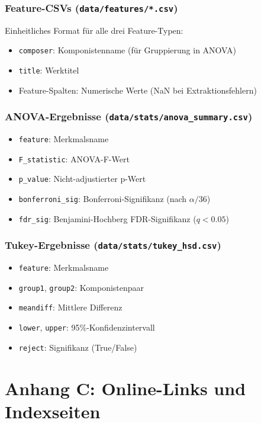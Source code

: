 \documentclass[12pt,a4paper]{article}
\theoremstyle{definition}
\begin{document}
\subsubsection{Feature-CSVs (\texttt{data/features/*.csv})}
Einheitliches Format für alle drei Feature-Typen:
\begin{itemize}
    \item \texttt{composer}: Komponistenname (für Gruppierung in ANOVA)
    \item \texttt{title}: Werktitel
    \item Feature-Spalten: Numerische Werte (NaN bei Extraktionsfehlern)
\end{itemize}

\subsubsection{ANOVA-Ergebnisse (\texttt{data/stats/anova\_summary.csv})}
\begin{itemize}
    \item \texttt{feature}: Merkmalsname
    \item \texttt{F\_statistic}: ANOVA-F-Wert
    \item \texttt{p\_value}: Nicht-adjustierter p-Wert
    \item \texttt{bonferroni\_sig}: Bonferroni-Signifikanz (nach $\alpha/36$)
    \item \texttt{fdr\_sig}: Benjamini-Hochberg FDR-Signifikanz ($q<0.05$)
\end{itemize}

\subsubsection{Tukey-Ergebnisse (\texttt{data/stats/tukey\_hsd.csv})}
\begin{itemize}
    \item \texttt{feature}: Merkmalsname
    \item \texttt{group1}, \texttt{group2}: Komponistenpaar
    \item \texttt{meandiff}: Mittlere Differenz
    \item \texttt{lower}, \texttt{upper}: 95\%-Konfidenzintervall
    \item \texttt{reject}: Signifikanz (True/False)
\end{itemize}

\section{Anhang C: Online-Links und Indexseiten}
\end{document}
